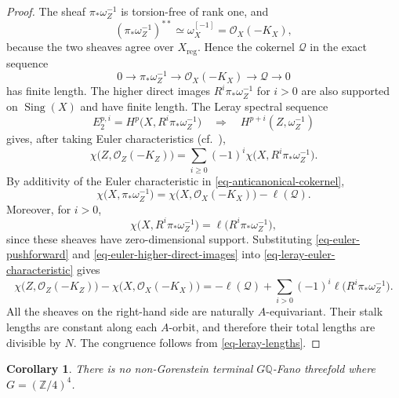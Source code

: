 \documentclass[10pt,oneside,reqno]{amsart}
\numberwithin{equation}{section}
\newtheorem{corollary}[theorem]{Corollary}
\theoremstyle{definition}
\newcommand{\Q}{\mathbb Q}
\newcommand{\Sing}{\operatorname{Sing}}
\begin{document}
\begin{proof}
The sheaf $\pi_*\omega_Z^{-1}$ is torsion-free of rank one, and
\[
 (\pi_*\omega_Z^{-1})^{**}\simeq\omega_X^{[-1]}
 =\mathcal O_X(-K_X),
\]
because the two sheaves agree over $X_{\mathrm{reg}}$.  Hence the
cokernel $\mathcal Q$ in the exact sequence
\begin{equation}
 0\longrightarrow\pi_*\omega_Z^{-1}
 \longrightarrow\mathcal O_X(-K_X)
 \longrightarrow\mathcal Q\longrightarrow0
 \label{eq-anticanonical-cokernel}
\end{equation}
has finite length.  The higher direct images
$R^i\pi_*\omega_Z^{-1}$ for $i>0$ are also supported on $\Sing(X)$ and
have finite length.  The Leray spectral sequence
\[
 E_2^{p,i}=H^p\bigl(X,R^i\pi_*\omega_Z^{-1}\bigr)
 \quad\Longrightarrow\quad
 H^{p+i}(Z,\omega_Z^{-1})
\]
gives, after taking Euler characteristics
(cf.~\cite[Tag~0EDD, Lemma~72.17.3]{StacksProject}),
\begin{equation}
 \chi\bigl(Z,\mathcal O_Z(-K_Z)\bigr)=
 \sum_{i\geq0}(-1)^i
 \chi\bigl(X,R^i\pi_*\omega_Z^{-1}\bigr).
 \label{eq-leray-euler-characteristic}
\end{equation}
By additivity of the Euler characteristic in
\eqref{eq-anticanonical-cokernel},
\begin{equation}
 \chi\bigl(X,\pi_*\omega_Z^{-1}\bigr)
 =\chi\bigl(X,\mathcal O_X(-K_X)\bigr)-\ell(\mathcal Q).
 \label{eq-euler-pushforward}
\end{equation}
Moreover, for $i>0$,
\begin{equation}
 \chi\bigl(X,R^i\pi_*\omega_Z^{-1}\bigr)
 =\ell\bigl(R^i\pi_*\omega_Z^{-1}\bigr),
\label{eq-euler-higher-direct-images}
\end{equation}
since these sheaves have zero-dimensional support.  Substituting
\eqref{eq-euler-pushforward} and
\eqref{eq-euler-higher-direct-images} into
\eqref{eq-leray-euler-characteristic} gives
\begin{equation}
 \chi\bigl(Z,\mathcal O_Z(-K_Z)\bigr)
 -\chi\bigl(X,\mathcal O_X(-K_X)\bigr)
 =-\ell(\mathcal Q)+
 \sum_{i>0}(-1)^i
 \ell\bigl(R^i\pi_*\omega_Z^{-1}\bigr).
 \label{eq-leray-lengths}
\end{equation}
All the sheaves on the right-hand side are naturally
$A$-equivariant.  Their stalk lengths are constant along each
$A$-orbit, and therefore their total lengths are divisible by $N$.
The congruence follows from \eqref{eq-leray-lengths}.
\end{proof}


\begin{corollary}
\label{cor-nongorenstein}
There is no non-Gorenstein terminal $G\Q$-Fano threefold where $G=(\mathbb{Z}/4)^4$.
\end{corollary}
\end{document}
